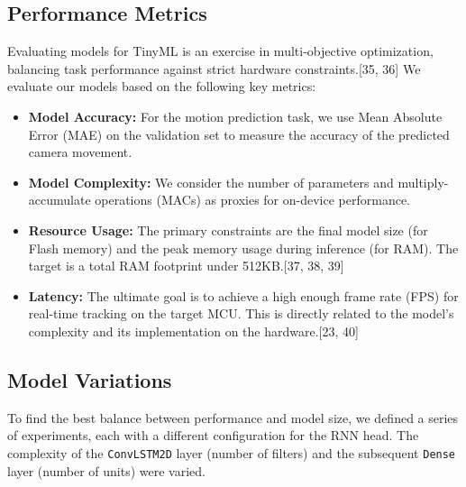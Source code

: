 \documentclass{article}
\begin{document}
\subsection{Performance Metrics}
Evaluating models for TinyML is an exercise in multi-objective optimization, balancing task performance against strict hardware constraints.[35, 36] We evaluate our models based on the following key metrics:
\begin{itemize}
    \item \textbf{Model Accuracy:} For the motion prediction task, we use Mean Absolute Error (MAE) on the validation set to measure the accuracy of the predicted camera movement.
    \item \textbf{Model Complexity:} We consider the number of parameters and multiply-accumulate operations (MACs) as proxies for on-device performance.
    \item \textbf{Resource Usage:} The primary constraints are the final model size (for Flash memory) and the peak memory usage during inference (for RAM). The target is a total RAM footprint under 512KB.[37, 38, 39]
    \item \textbf{Latency:} The ultimate goal is to achieve a high enough frame rate (FPS) for real-time tracking on the target MCU. This is directly related to the model's complexity and its implementation on the hardware.[23, 40]
\end{itemize}

\subsection{Model Variations}
To find the best balance between performance and model size, we defined a series of experiments, each with a different configuration for the RNN head.
The complexity of the \texttt{ConvLSTM2D} layer (number of filters) and the subsequent \texttt{Dense} layer (number of units) were varied.
\end{document}
